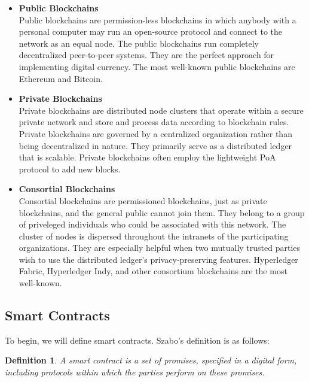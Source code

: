 \begin{itemize}
   

 \item \textbf{Public Blockchains} \\
Public blockchains are permission-less blockchains in which anybody with a personal computer may run an open-source protocol and connect to the network as an equal node. The public blockchains run completely decentralized peer-to-peer systems. They are the perfect approach for implementing digital currency. The most well-known public blockchains are Ethereum and Bitcoin.

\vspace{.5cm}

\item \textbf{Private Blockchains} \\
Private blockchains are distributed node clusters that operate within a secure private network and store and process data according to blockchain rules. Private blockchains are governed by a centralized organization rather than being decentralized in nature. They primarily serve as a distributed ledger that is scalable. Private blockchains often employ the lightweight \ac{PoA} protocol to add new blocks.

\vspace{.5cm}

 \item \textbf{Consortial Blockchains}\\
Consortial blockchains are permissioned blockchains, just as private blockchains, and the general public cannot join them. They belong to a group of priveleged individuals who could be associated with this network. The cluster of nodes is dispersed throughout the intranets of the participating organizations. They are especially helpful when two mutually trusted parties wish to use the distributed ledger's privacy-preserving features. Hyperledger Fabric, Hyperledger Indy, and other consortium blockchains are the most well-known.
\end{itemize}

\subsection{Smart Contracts}

To begin, we will define smart contracts. Szabo's \cite{def1} definition is as follows:


\newtheorem{definition}{Definition}
\begin{definition}
  A smart contract is a set of promises, specified in a digital form, including protocols within which the parties perform on these promises.
\end{definition}


